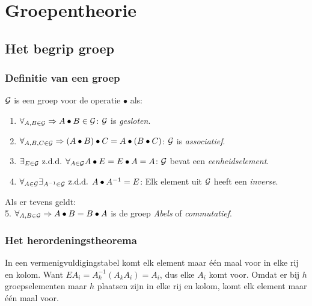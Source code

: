 \documentclass[twoside]{report}
\begin{document}
\chapter{Groepentheorie}
\def\G{{\cal{G}}}
\def\HH{{\cal{H}}}
\def\II{I\hspace{-0.8ex}I}
\section{Het begrip groep}
\subsection{Definitie van een groep}
$\G$ is een groep voor de operatie $\bullet$ als:
\begin{enumerate}
\item $\forall_{A,B\in\G}\Rightarrow A\bullet B\in\G$: $\G$ is {\it gesloten}.
\item $\forall_{A,B,C\in\G}\Rightarrow (A\bullet B)\bullet C=A\bullet(B\bullet C)$: $\G$ is {\it associatief}.
\item $\exists_{E\in\G}\mbox{ z.d.d. }\forall_{A\in\G}A\bullet E=E\bullet A=A$: $\G$ bevat een {\it eenheidselement}.
\item $\forall_{A\in\G}\exists_{A^{-1}\in\G}\mbox{ z.d.d. }A\bullet A^{-1}=E$: Elk element uit $\G$ heeft een {\it inverse}.
\end{enumerate}
Als er tevens geldt:\\
\hspace*{4.5mm}5. $\forall_{A,B\in\G}\Rightarrow A\bullet B=B\bullet A$
is de groep {\it Abels} of {\it commutatief}.

\subsection{Het herordeningstheorema}
In een vermenigvuldigingstabel komt elk element maar \'e\'en maal voor in elke
rij en kolom. Want $EA_i=A_k^{-1}(A_kA_i)=A_i$, dus elke $A_i$ komt voor.
Omdat er bij $h$ groepselementen maar $h$ plaatsen zijn in elke rij en kolom,
komt elk element maar \'e\'en maal voor.
\end{document}
